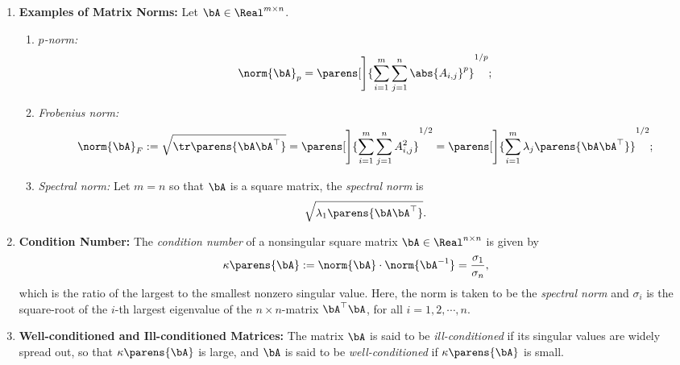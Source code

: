 \documentclass[12pt]{article}
\begin{document}
\begin{enumerate}[label=\textbf{\arabic*.}]
	\item \textbf{Examples of Matrix Norms:} Let $\bA \in \Real^{m \times n}$. 
	\begin{enumerate}
		\item \textit{$p$-norm:} 
		\begin{align*}
			\norm{\bA}_p = \parens[\Bigg]{\sum_{i=1}^m \sum_{j=1}^n \abs{A_{i,j}}^p}^{1/p}; 
		\end{align*}
		\item \textit{Frobenius norm:} 
		\begin{align*}
			\norm{\bA}_{F} := \sqrt{\tr\parens{\bA \bA^\top}} = \parens[\Bigg]{\sum_{i=1}^m \sum_{j=1}^n A_{i,j}^2}^{1/2} = \parens[\Bigg]{\sum_{i=1}^m \lambda_j \parens{\bA \bA^\top}}^{1/2}; 
		\end{align*}
		\item \textit{Spectral norm:} Let $m = n$ so that $\bA$ is a square matrix, the \emph{spectral norm} is 
		\begin{align*}
			\sqrt{\lambda_1 \parens{\bA\bA^\top}}. 
		\end{align*}
	\end{enumerate}
	
	\item \textbf{Condition Number:} The \textit{condition number} of a nonsingular square matrix $\bA \in \Real^{n \times n}$ is given by
	\begin{align}
		\kappa \parens{\bA} := \norm{\bA} \cdot \norm{\bA^{-1}} = \frac{\sigma_1}{\sigma_n}, 
	\end{align}
	which is the ratio of the largest to the smallest nonzero singular value. Here, the norm is taken to be the \textit{spectral norm} and $\sigma_i$ is the square-root of the $i$-th largest eigenvalue of the $n \times n$-matrix $\bA^\top \bA$, for all $i = 1, 2, \cdots, n$. 
	
	\item \textbf{Well-conditioned and Ill-conditioned Matrices:} The matrix $\bA$ is said to be \textit{ill-conditioned} if its singular values are widely spread out, so that $\kappa \parens{\bA}$ is large, and $\bA$ is said to be \textit{well-conditioned} if $\kappa \parens{\bA}$ is small. 
	

\end{enumerate}
\end{document}
